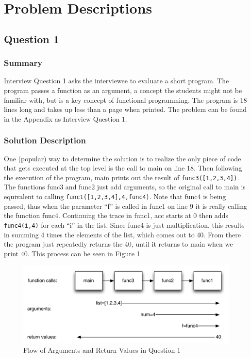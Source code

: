 \section{Problem Descriptions}

\subsection{Question 1}
\subsubsection{Summary}
Interview Question 1 asks the interviewee to evaluate a short program.
The program passes a function as an argument, a concept the students might not be familiar with, but is a key concept of functional programming.
The program is 18 lines long and takes up less than a page when printed.
The problem can be found in the Appendix as Interview Question 1.
\subsubsection{Solution Description}

One (popular) way to determine the solution is to realize the only piece of code that gets executed at the top level is the call to main on line 18.
Then following the execution of the program, main prints out the result of \texttt{func3([1,2,3,4])}.
The functions func3 and func2 just add arguments, so the original call to main is equivalent to calling \texttt{func1([1,2,3,4],4,func4)}.
Note that func4 is being passed, thus when the parameter ``f'' is called in func1 on line 9 it is really calling the function func4.
Continuing the trace in func1, acc starts at $0$ then adds \texttt{func4(i,4)} for each ``i'' in the list.
Since func4 is just multiplication, this results in summing 4 times the elements of the list, which comes out to 40.
From there the program just repeatedly returns the 40, until it returns to main when we print 40.
This process can be seen in Figure \ref{fig-q1}.

\begin{figure}[t]
\centering
\includegraphics[width=1.0\textwidth]{Q1diagram.pdf}
\caption{Flow of Arguments and Return Values in Question 1}
\label{fig-q1}
\end{figure}
 
